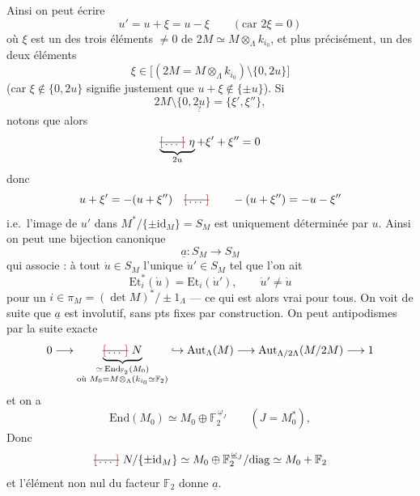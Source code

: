 \documentclass[11pt,a4paper]{article}
\begin{document}
Ainsi on peut écrire
\[
u'=u+\xi=u-\xi\qquad(\text{car } 2\xi=0)
\]
où $\xi$ est un des trois éléments $\neq0$ de $2M\simeq M\otimes_\Lambda k_{i_0}$, et plus
précisément, un des deux éléments \struck{\ill{}}
\[
\xi\in\bigl[(2M=M\otimes_\Lambda k_{i_0})\setminus\{0,2u\}\bigr]
\]
(car $\xi\notin\{0,2u\}$ signifie justement que $u+\xi\notin\{\pm u\}$).
Si
\[
2M\setminus\{0,\underset{?}{2u}\}=\{\xi',\xi''\},
\]
notons que alors
\[
\underbrace{\text{\struck{\ill{}}}\ \eta}_{2u}+\xi'+\xi''=0
\]
donc
\[
u+\xi'=-(u+\xi'')\quad \text{\struck{\ill{}}}\qquad -(u+\xi'')=-u-\xi''
\]
i.e.\ l'image de $u'$ dans $M^{*}/\{\pm\mathrm{id}_M\}=S_M$ est uniquement déterminée par $u$.
Ainsi on peut \ill{} une bijection canonique
\[
\underline{a}\colon S_M\longrightarrow S_M
\]
qui associe : à tout $\dot u\in S_M$ l'unique $\dot u'\in S_M$ tel que l'on ait
\[
\mathrm{Et}_i^{*}(\dot u)=\mathrm{Et}_i(\dot u'),\qquad \dot u'\neq\dot u
\]
pour un $i\in\pi_M=(\det M)^{*}/\pm1_\Lambda$ --- ce qui est alors vrai pour tous.
On voit de suite que $\underline{a}$ est involutif,  sans pts fixes par construction.
On peut    antipodismes par la suite exacte
\[
0\longrightarrow \underbrace{\text{\struck{\ill{}}}\ N}_{\substack{\simeq\,\mathrm{End}_{\mathbb{F}_2}(M_0)\\ \text{où } M_0=M\otimes_\Lambda(k_{i_0}\simeq\mathbb{F}_2)}}
\hookrightarrow \mathrm{Aut}_\Lambda(M)\longrightarrow\mathrm{Aut}_{\Lambda/2\Lambda}(M/2M)\longrightarrow1
\]
et on a
\[
\mathrm{End}(M_0)\simeq M_0\oplus\mathbb{F}_2^{\,\underline{\omega}_J}\qquad(J=M_0^{*}) ,
\]
Donc
\[
\text{\struck{\ill{}}}\ N/\{\pm\mathrm{id}_M\}\simeq M_0\oplus\mathbb{F}_2^{\,\underline{\omega}_J}/\mathrm{diag}\simeq M_0+\mathbb{F}_2
\]
et l'élément non nul du facteur $\mathbb{F}_2$ donne $\underline{a}$.
\end{document}
